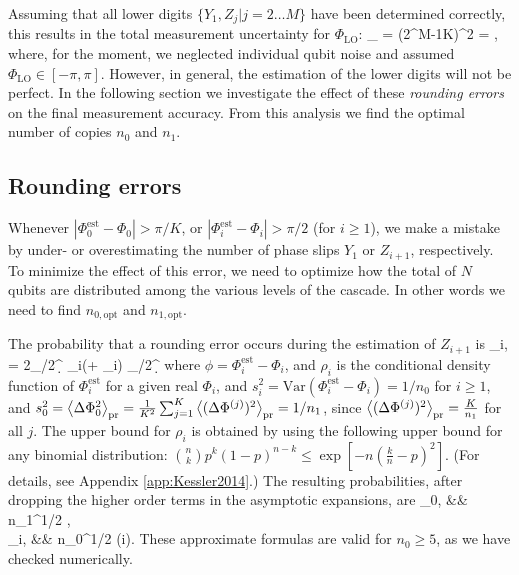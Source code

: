 Assuming that all lower digits $\{Y_1,Z_j|j=2\hdots M \}$ have been determined correctly, this results in the total measurement uncertainty for $\Phi_\mathrm{LO}$:
\bel
	\label{eq:projection_GHZ 2}
	_ =
	 {(2^{M-1}K)^2} = ,
\eel
where, for the moment, we neglected individual qubit noise and assumed
$\Phi_\mathrm{LO}\in[-\pi,\pi]$.
However, in general, the estimation of the lower digits will not be perfect. In
the following section we investigate the effect of these \textit{rounding
errors} on the final measurement accuracy. From this analysis we find the
optimal number of copies $n_0$ and $n_1$.

\subsection{Rounding errors}
Whenever $|\Phi_0^\mathrm{est} - \Phi_0| > \pi/K$, or
$|\Phi_i^\mathrm{est} - \Phi_i| > \pi/2$ (for $i \geq 1$), we make a mistake by
under- or overestimating the number of phase slips $Y_1$ or $Z_{i+1}$,
respectively. To minimize the effect of this error, we need to optimize how the
total of $N$ qubits are distributed among the  various levels of the cascade. In
other words we need to find $n_{0,\mathrm{opt}}$ and $n_{1,\mathrm{opt}}$.

The probability that a rounding error occurs during the estimation of $Z_{i+1}$
is
\bel
	\PP_{i,} = 2\intop_{\pi/2}^\infty \d{\phi}
	\rho_i(\phi + \Phi_i) \intop_{\pi/2}^\infty \d{\phi} 
	\exp{}
\eel
where $\phi = \Phi_i^{\mathrm{est}} - \Phi_i$, and $\rho_i$ is the conditional
density function of $\Phi_i^\mathrm{est}$ for a given real $\Phi_i$, and $s_i^2 =
\mathrm{Var}(\Phi_i^\mathrm{est} - \Phi_i) = 1/n_0$ for $i\geq 1$, and $s_0^2 =
\left< \Delta\Phi_0^2 \right>_\mathrm{pr} = \frac{1}{K^2}\sum_{j=1}^K
\left< (\Delta\Phi^{(j)})^2 \right>_\mathrm{pr} = 1/n_1$, since
$\left< (\Delta\Phi^{(j)})^2 \right>_\mathrm{pr} = \frac{K}{n_1}$ for all $j$.
The upper bound for $\rho_i$ is obtained 
by using the following upper bound for any binomial
distribution: ${n\choose k}p^k(1-p)^{n-k} \leq
\exp\left[-n\left(\frac{k}{n}-p\right)^2\right]$. (For details, see
Appendix \ref{app:Kessler2014}.)  The resulting probabilities, after
dropping the higher order terms in the asymptotic expansions, are
\bal
	\PP_{0,} &\approx&  n_1^{1/2}
	\exp{},
	\\
	\PP_{i,} &\approx&  n_0^{1/2}
	\exp{}\qquad (i).
\eal
These approximate formulas are valid for $n_0 \geq 5$, as we have checked
numerically.

